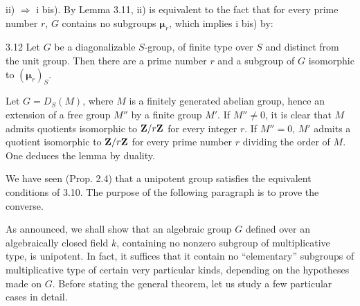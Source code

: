 \noindent ii) $\Rightarrow$ i bis). By Lemma 3.11, ii) is equivalent to the fact that for every prime number $r$, $G$ contains no subgroups $\boldsymbol\mu_r$, which implies i bis) by:
\begin{lemma}{3.12}\label{XVII.3.12}
Let $G$ be a diagonalizable $S$-group, of finite type over $S$ and distinct from the unit group. Then there are a prime number $r$ and a subgroup of $G$ isomorphic to $(\boldsymbol\mu_r)_S$.
\end{lemma}
Let $G=D_S(M)$, where $M$ is a finitely generated abelian group, hence an extension of a free group $M''$ by a finite group $M'$. If $M''\neq0$, it is clear that $M$ admits quotients isomorphic to $\mathbf{Z}/r\mathbf{Z}$ for every integer $r$. If $M''=0$, $M'$ admits a quotient isomorphic to $\mathbf{Z}/r\mathbf{Z}$ for every prime number $r$ dividing the order of $M$. One deduces the lemma by duality.

We have seen (Prop. 2.4) that a unipotent group satisfies the equivalent conditions of 3.10. The purpose of the following paragraph is to prove the converse.

As announced, we shall show that an algebraic group $G$ defined over an algebraically closed field $k$, containing no nonzero subgroup of multiplicative type, is unipotent. In fact, it suffices that it contain no ``elementary'' subgroups of multiplicative type of certain very particular kinds, depending on the hypotheses made on $G$. Before stating the general theorem, let us study a few particular cases in detail.

